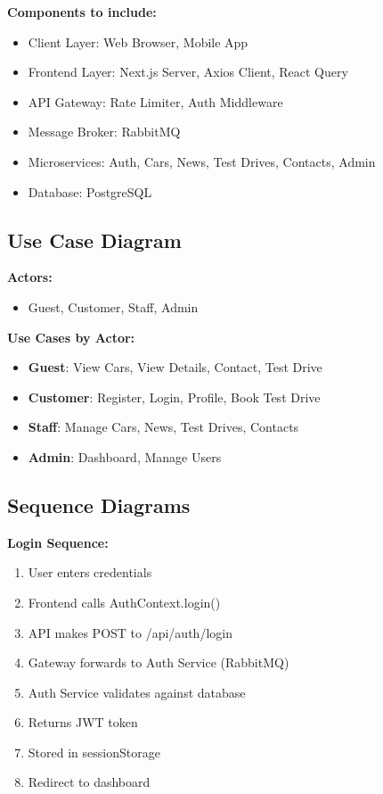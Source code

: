 \documentclass[12pt,a4paper]{article}
\begin{document}
\bigskip
\noindent\textbf{Components to include:}
\begin{itemize}
    \item Client Layer: Web Browser, Mobile App
    \item Frontend Layer: Next.js Server, Axios Client, React Query
    \item API Gateway: Rate Limiter, Auth Middleware
    \item Message Broker: RabbitMQ
    \item Microservices: Auth, Cars, News, Test Drives, Contacts, Admin
    \item Database: PostgreSQL
\end{itemize}

\subsection{Use Case Diagram}

\bigskip
\noindent\textbf{Actors:}
\begin{itemize}
    \item Guest, Customer, Staff, Admin
\end{itemize}

\noindent\textbf{Use Cases by Actor:}
\begin{itemize}
    \item \textbf{Guest}: View Cars, View Details, Contact, Test Drive
    \item \textbf{Customer}: Register, Login, Profile, Book Test Drive
    \item \textbf{Staff}: Manage Cars, News, Test Drives, Contacts
    \item \textbf{Admin}: Dashboard, Manage Users
\end{itemize}

\subsection{Sequence Diagrams}

\bigskip
\noindent\textbf{Login Sequence:}
\begin{enumerate}
    \item User enters credentials
    \item Frontend calls AuthContext.login()
    \item API makes POST to /api/auth/login
    \item Gateway forwards to Auth Service (RabbitMQ)
    \item Auth Service validates against database
    \item Returns JWT token
    \item Stored in sessionStorage
    \item Redirect to dashboard
\end{enumerate}
\end{document}
